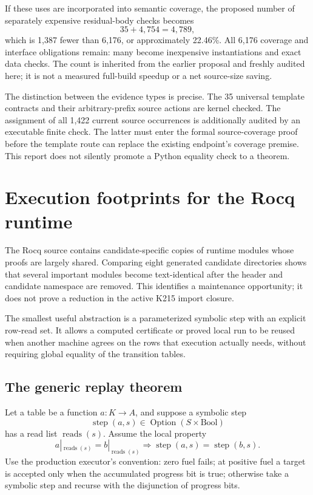 \documentclass[11pt,letterpaper]{article}
\theoremstyle{definition}
\theoremstyle{remark}
\begin{document}
If these uses are incorporated into semantic coverage, the proposed number
of separately expensive residual-body checks becomes
\[
 35+4,754=4,789,
\]
which is 1,387 fewer than 6,176, or approximately 22.46\%. All 6,176 coverage
and interface obligations remain: many become inexpensive instantiations
and exact data checks. The count is inherited from the earlier proposal
and freshly audited here; it is not a measured full-build speedup or a net
source-size saving.

The distinction between the evidence types is precise. The 35 universal
template contracts and their arbitrary-prefix source actions are kernel checked.
The assignment of all 1,422 current
source occurrences is additionally audited by an executable finite check.
The latter must enter the formal source-coverage proof before the template
route can replace the existing endpoint's coverage premise. This report
does not silently promote a Python equality check to a theorem.

\section{Execution footprints for the Rocq runtime}
\label{sec:footprint}

The Rocq source contains candidate-specific copies of runtime modules whose
proofs are largely shared. Comparing eight generated candidate directories
shows that several important modules become text-identical after the header
and candidate namespace are removed. This identifies a maintenance
opportunity; it does not prove a reduction in the active K215 import closure.

The smallest useful abstraction is a parameterized symbolic step with an
explicit row-read set. It allows a computed certificate or proved local run
to be reused when another machine agrees on the rows that execution actually
needs, without requiring global equality of the transition tables.

\subsection{The generic replay theorem}

Let a table be a function $a:K\to A$, and suppose a symbolic step
\[
 \operatorname{step}(a,s)\in\operatorname{Option}(S\times\mathrm{Bool})
\]
has a read list $\operatorname{reads}(s)$. Assume the local property
\[
 a|_{\operatorname{reads}(s)}=b|_{\operatorname{reads}(s)}
 \Longrightarrow \operatorname{step}(a,s)=\operatorname{step}(b,s).
\]
Use the production executor's convention: zero fuel fails; at positive
fuel a target is accepted only when the accumulated progress bit is true;
otherwise take a symbolic step and recurse with the disjunction of progress
bits.
\end{document}
